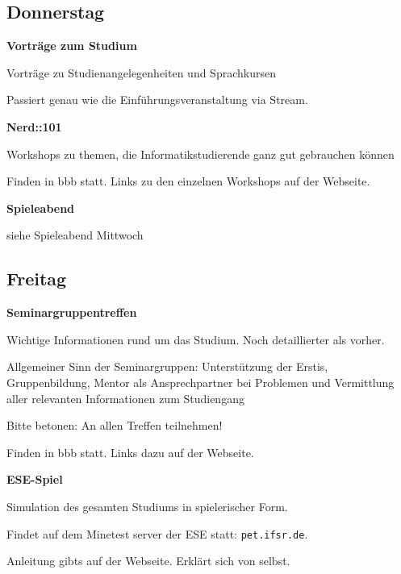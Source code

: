 \documentclass[a4paper,12pt]{scrreprt}
\begin{document}
\subsection{Donnerstag}
\textbf{Vorträge zum Studium}
\begin{itemize*}
    \item Vorträge zu Studienangelegenheiten und Sprachkursen
    \item Passiert genau wie die Einführungsveranstaltung via Stream.
\end{itemize*}

\textbf{Nerd::101}
\begin{itemize*}
    \item Workshops zu themen, die Informatikstudierende ganz gut gebrauchen können
    \item Finden in bbb statt. Links zu den einzelnen Workshops auf der Webseite.
\end{itemize*}

\textbf{Spieleabend}
\begin{itemize*}
    \item siehe Spieleabend Mittwoch
\end{itemize*}


\subsection{Freitag}
\textbf{Seminargruppentreffen}
\begin{itemize*}
    \item Wichtige Informationen rund um das Studium. Noch detaillierter als vorher.
    \item Allgemeiner Sinn der Seminargruppen: Unterstützung der Erstis, Gruppenbildung, Mentor als Ansprechpartner bei Problemen und Vermittlung aller relevanten Informationen zum Studiengang
    \item Bitte betonen: An allen Treffen teilnehmen!
    \item Finden in bbb statt. Links dazu auf der Webseite.
\end{itemize*}

\textbf{ESE-Spiel}
\begin{itemize*}
    \item Simulation des gesamten Studiums in spielerischer Form.
    \item Findet auf dem Minetest server der ESE statt: \texttt{pet.ifsr.de}.
    \item Anleitung gibts auf der Webseite. Erklärt sich von selbst.
\end{itemize*}
\end{document}
